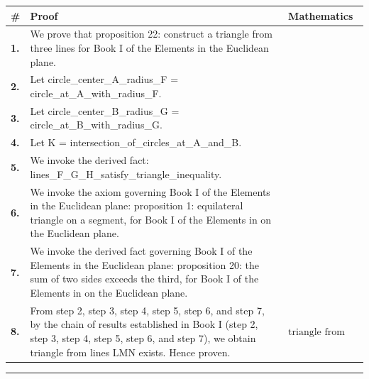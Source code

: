 \documentclass[11pt]{article}
\theoremstyle{definition}
\begin{document}
\begin{tabular}{@{} >{\raggedright\arraybackslash}p{} >{\raggedright\arraybackslash}p{} >{\raggedleft\arraybackslash}p{} @{}}
\textbf{\#} & \textbf{Proof} & \textbf{Mathematics} \\
\midrule
\textbf{1.} & We prove that proposition 22: construct a triangle from three lines for Book I of the Elements in the Euclidean plane. & \\[0.45em]
\textbf{2.} & Let circle\_center\_A\_radius\_F = circle\_at\_A\_with\_radius\_F. & \\[0.45em]
\textbf{3.} & Let circle\_center\_B\_radius\_G = circle\_at\_B\_with\_radius\_G. & \\[0.45em]
\textbf{4.} & Let K = intersection\_of\_circles\_at\_A\_and\_B. & \\[0.45em]
\textbf{5.} & We invoke the derived fact: lines\_F\_G\_H\_satisfy\_triangle\_inequality. & \\[0.45em]
\textbf{6.} & We invoke the axiom governing Book I of the Elements in the Euclidean plane: proposition 1: equilateral triangle on a segment, for Book I of the Elements in on the Euclidean plane. & \\[0.45em]
\textbf{7.} & We invoke the derived fact governing Book I of the Elements in the Euclidean plane: proposition 20: the sum of two sides exceeds the third, for Book I of the Elements in on the Euclidean plane. & \\[0.45em]
\textbf{8.} & From step 2, step 3, step 4, step 5, step 6, and step 7, by the chain of results established in Book I (step 2, step 3, step 4, step 5, step 6, and step 7), we obtain triangle from lines LMN exists. Hence proven. & $\displaystyle \text{triangle from lines LMN exists}$ \\[0.45em]
\bottomrule
\end{tabular}
\label{thm:Geometry-Euclid Book I-proposition_22_construct_a_triangle_from_three_lines}
\par\medskip\hrule
\end{document}
